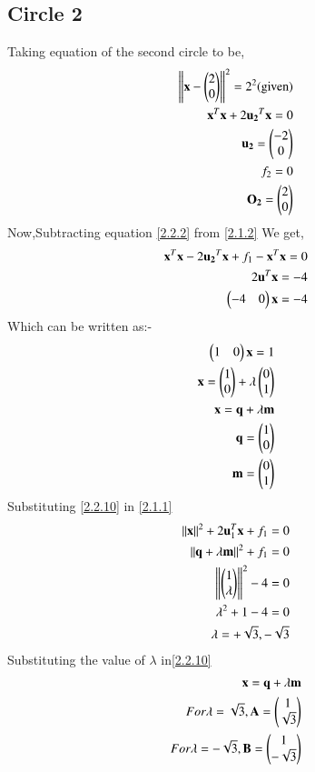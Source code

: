 \documentclass[journal,12pt,twocolumn]{IEEEtran}
\begin{document}
 \subsection{Circle 2}
Taking equation of the second circle to be,
\begin{align}
  \left\lVert\mathbf{x}-\begin{pmatrix}2\\0\end{pmatrix}\right\rVert^2=2^2 \text{(given)}\\
  {\mathbf{x}^{T}\mathbf{x}+2\mathbf{u_2}^T\mathbf{x}}=0 \label{2.2.2}\\
  \mathbf{u_2}=\begin{pmatrix}-2\\0\end{pmatrix}\\
 f_2=0\\
 \mathbf{O_2}=\begin{pmatrix}2\\0\end{pmatrix}
  \end{align}
 Now,Subtracting equation \eqref{2.2.2} from \eqref{2.1.2} We get,
 \begin{align}
 \mathbf{x}^T\mathbf{x}-2\mathbf{u_2}^T\mathbf{x}+f_1-\mathbf{x}^{T}\mathbf{x}=0\\
 2\mathbf{u}^{T}\mathbf{x}=-4\\
 \begin{pmatrix}-4&0\end{pmatrix}\mathbf{x}=-4
 \end{align}
 Which can be written as:-
 \begin{align}
 \begin{pmatrix}1&0\end{pmatrix}\mathbf{x}=1\\
 \mathbf{x}=\begin{pmatrix}1 \\ 0\end{pmatrix} + \lambda \begin{pmatrix}0\\1\end{pmatrix}\\
\mathbf{x}=\mathbf{q}+\lambda\mathbf{m}\label{2.2.10}\\
\mathbf{q}=\begin{pmatrix}1 \\ 0\end{pmatrix} \\
\mathbf{m}=\begin{pmatrix}0\\1\end{pmatrix}
  \end{align}
 Substituting \eqref{2.2.10} in \eqref{2.1.1}
  \begin{align}
 \left\lVert\mathbf{x}\right\rVert^2 + 2\mathbf{u}_1^T\mathbf{x} + f_1 = 0\\
 \left\lVert\mathbf{q}+\lambda\mathbf{m}\right\rVert^2 + f_1 = 0\\
 \left\lVert\begin{pmatrix}1\\\lambda\end{pmatrix}\right\rVert^2-4=0\\
 \lambda^2+1-4=0\\
 \lambda=+\sqrt{3},-\sqrt{3}\\
 \end{align}
Substituting the value of $\lambda$ in\eqref{2.2.10}
\begin{align}
\mathbf{x}=\mathbf{q}+\lambda\mathbf{m}\\
For \lambda=\sqrt{3},\mathbf{A}=\begin{pmatrix}1\\\sqrt{3}\end{pmatrix}\\
For \lambda=-\sqrt{3},\mathbf{B}=\begin{pmatrix}1\\-\sqrt{3}\end{pmatrix}
 \end{align} 
\end{document}
